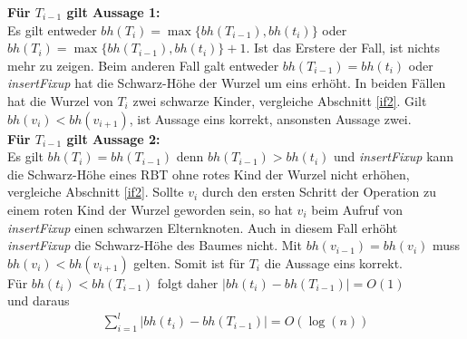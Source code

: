 \documentclass[a4paper,12pt]{article}
\begin{document}
\noindent \textbf{Für $T_{i-1}$ gilt Aussage 1:}\\
Es gilt entweder $\mathit{bh} \left(T_{i} \right) = \max\{\mathit{bh} \left(T_{i-1}\right), \mathit{bh} \left(t_{i} \right) \} $  oder \\ $\mathit{bh} \left(T_{i} \right) = \max\{\mathit{bh} \left(T_{i-1}\right), \mathit{bh} \left(t_{i} \right) \} + 1$. Ist das Erstere der Fall, ist nichts mehr zu zeigen. Beim anderen Fall galt entweder  $\mathit{bh} \left(T_{i-1} \right) =  \mathit{bh} \left(t_{i} \right)$ oder \\ \textit{insertFixup} hat die Schwarz-Höhe der Wurzel um eins erhöht. In beiden Fällen hat die Wurzel von $T_i$ zwei schwarze Kinder, vergleiche Abschnitt \ref{if2}. Gilt  $\mathit{bh} \left(v_{i} \right) < \mathit{bh} \left(v_{i+1} \right)$, ist Aussage eins korrekt, ansonsten Aussage zwei.\\

\noindent \textbf{Für $T_{i-1}$ gilt Aussage 2:}\\
 Es gilt $\mathit{bh} \left(T_{i} \right) = \mathit{bh} \left(T_{i-1} \right)$ denn $\mathit{bh} \left(T_{i-1} \right) > \mathit{bh} \left(t_{i} \right)$ und \textit{insertFixup} kann die Schwarz-Höhe eines RBT  ohne rotes Kind der Wurzel nicht erhöhen, vergleiche Abschnitt \ref{if2}. Sollte $v_i$ durch den ersten Schritt der Operation zu einem roten Kind der Wurzel geworden sein, so hat $v_i$ beim Aufruf von \textit{insertFixup} einen schwarzen Elternknoten. Auch in diesem Fall erhöht \mbox{\textit{insertFixup}} die Schwarz-Höhe des Baumes nicht. Mit  $\mathit{bh} \left(v_{i-1} \right) = \mathit{bh} \left(v_{i} \right)$ muss  $\mathit{bh} \left(v_{i} \right) < \mathit{bh} \left(v_{i+1} \right)$ gelten. Somit ist für $T_i$ die Aussage eins korrekt.\\

 

\noindent Für $\mathit{bh} \left(t_{i} \right) < \mathit{bh} \left(T_{i-1} \right)$ folgt daher  $\vert\mathit{bh} \left(t_{i} \right) -\mathit{bh} \left(T_{i-1} \right) \vert = O\left(1\right) $ \\ und daraus
\begin{align*}
\sum_{i = 1}^{l} \vert\mathit{bh} \left(t_{i} \right) -\mathit{bh} \left(T_{i-1} \right) \vert =  O \left(\log \left(n \right) \right) 
\end{align*}
\end{document}
